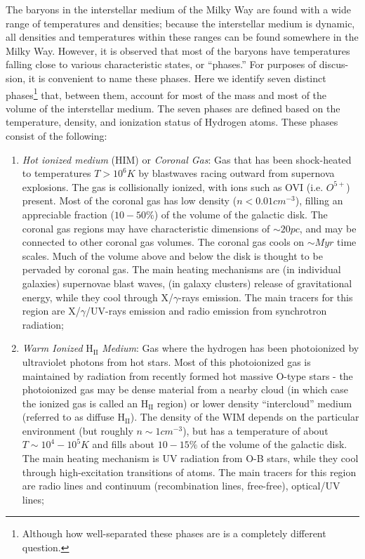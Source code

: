 The baryons in the interstellar medium of the Milky Way are found with a wide range of temperatures and densities; because the interstellar medium is dynamic, all densities and temperatures within these ranges can be found somewhere in the Milky Way. However, it is observed that most of the baryons have temperatures falling close to various characteristic states, or “phases.” For purposes of discus- sion, it is convenient to name these phases. Here we identify seven distinct phases\footnote{Although how well-separated these phases are is a completely different question.} that, between them, account for most of the mass and most of the volume of the interstellar medium. The seven phases are defined based on the temperature, density, and ionization status of Hydrogen atoms. These phases consist of the following:
\begin{enumerate}
    \item \emph{Hot ionized medium} (HIM) or \emph{Coronal Gas}:  Gas that has been shock-heated to temperatures $T>10^{6}\unit{K}$ by blastwaves racing outward from supernova explosions. The gas is collisionally ionized, with ions such as OVI (i.e. $O^{5+}$) present. Most of the coronal gas has low density ($n<0.01\unit{cm}^{-3}$), filling an appreciable fraction ($10-50\%$) of the volume of the galactic disk. The coronal gas regions may have characteristic dimensions of $\sim 20 \unit{pc}$, and may be connected to other coronal gas volumes. The coronal gas cools on $\sim\unit{Myr}$ time scales. Much of the volume above and below the disk is thought to be pervaded by coronal gas. The main heating mechanisms are (in individual galaxies) supernovae blast waves, (in galaxy clusters) release of gravitational energy, while they cool through X/$\gamma$-rays emission. The main tracers for this region are X/$\gamma$/UV-rays emission and radio emission from synchrotron radiation;
    \item \emph{Warm Ionized} H$_{\text{II}}$ \emph{Medium}:  Gas where the hydrogen has been photoionized by ultraviolet photons from hot stars. Most of this photoionized gas is maintained by radiation from recently formed hot massive O-type stars - the photoionized gas may be dense material from a nearby cloud (in which case the ionized gas is called an H$_{\text{II}}$ region) or lower density “intercloud” medium (referred to as diffuse H$_{\text{II}}$). The density of the WIM depends on the particular environment (but roughly $n \sim 1\unit{cm}^{-3}$), but has a temperature of about $T\sim 10^{4}-10^{5}\unit{K}$ and fills about $10-15\%$ of the volume of the galactic disk. The main heating mechanism is UV radiation from O-B stars, while they cool through high-excitation transitions of atoms. The main tracers for this region are radio lines and continuum (recombination lines, free-free), optical/UV lines;

\end{enumerate}
